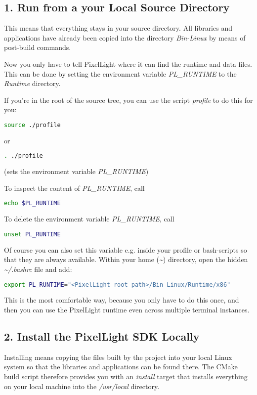 \subsection{1. Run from a your Local Source Directory}
This means that everything stays in your source directory. All libraries and applications have already been copied into the directory \emph{Bin-Linux} by means of post-build commands.

Now you only have to tell PixelLight where it can find the runtime and data files. This can be done by setting the environment variable \emph{PL\_RUNTIME} to the \emph{Runtime} directory.

If you're in the root of the source tree, you can use the script \emph{profile} to do this for you:
\begin{lstlisting}[language=bash]
source ./profile
\end{lstlisting}
or
\begin{lstlisting}[language=bash]
. ./profile
\end{lstlisting}
(sets the environment variable \emph{PL\_RUNTIME})

To inspect the content of \emph{PL\_RUNTIME}, call
\begin{lstlisting}[language=bash]
echo $PL_RUNTIME
\end{lstlisting}

To delete the environment variable \emph{PL\_RUNTIME}, call
\begin{lstlisting}[language=bash]
unset PL_RUNTIME
\end{lstlisting}

Of course you can also set this variable e.g. inside your profile or bash-scripts so that they are always available. Within your home (\emph{\textasciitilde}) directory, open the hidden \emph{\textasciitilde /.bashrc} file and add:
\begin{lstlisting}[language=bash]
export PL_RUNTIME="<PixelLight root path>/Bin-Linux/Runtime/x86"
\end{lstlisting}
This is the most comfortable way, because you only have to do this once, and then you can use the PixelLight runtime even across multiple terminal instances.



\subsection{2. Install the PixelLight SDK Locally}
Installing means copying the files built by the project into your local Linux system so that the libraries and applications can be found there. The CMake build script therefore provides you with an \emph{install} target that installs everything on your local machine into the \emph{/usr/local} directory.

